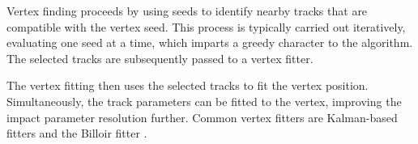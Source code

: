 Vertex finding proceeds by using seeds to identify nearby tracks that are compatible with the vertex seed. This process is typically carried out iteratively, evaluating one seed at a time, which imparts a greedy character to the algorithm. The selected tracks are subsequently passed to a vertex fitter.

The vertex fitting then uses the selected tracks to fit the vertex position. Simultaneously, the track parameters can be fitted to the vertex, improving the impact parameter resolution further. Common vertex fitters are Kalman-based fitters \cite{fruehwirth} and the Billoir fitter \cite{billoir}.
